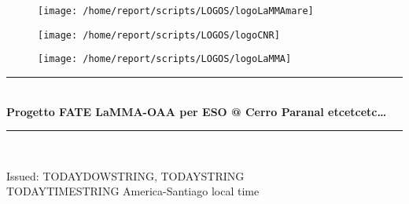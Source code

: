 \documentclass[11pt,english]{article}
\newcommand{\HRule}{\rule{\linewidth}{0.5mm}}
\begin{document}
\begin{figure}
\begin{center}
\hspace{.5cm}
\parbox{5.5cm}{\texttt{[image: /home/report/scripts/LOGOS/logoLaMMAmare]}}
\hspace{.5cm}
\parbox{5.5cm}{\texttt{[image: /home/report/scripts/LOGOS/logoCNR]}}
\hspace{.5cm}
\parbox{5.5cm}{\texttt{[image: /home/report/scripts/LOGOS/logoLaMMA]}}
\hspace{.1cm}
\vspace{1.2cm}
\end{center}
\end{figure}

\begin{center}
\HRule \\[0.4cm]
\Huge{\textbf{Progetto FATE LaMMA-OAA per ESO @ Cerro Paranal etcetcetc\ldots}}
\HRule \\[0.4cm]
\end{center}

\begin{center}
\vspace{2cm}\Huge{Issued: TODAYDOWSTRING, TODAYSTRING\\ TODAYTIMESTRING America-Santiago local time}
\end{center}
\end{document}

